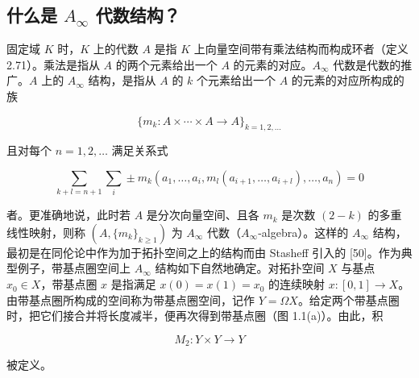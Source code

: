 \subsection{什么是 $A_\infty$ 代数结构？}

固定域 $K$ 时，$K$ 上的代数 $A$ 是指 $K$ 上向量空间带有乘法结构而构成环者（定义 2.71）。乘法是指从 $A$ 的两个元素给出一个 $A$ 的元素的对应。$A_\infty$ 代数是代数的推广。$A$ 上的 $A_\infty$ 结构，是指从 $A$ 的 $k$ 个元素给出一个 $A$ 的元素的对应所构成的族

\[\{m_k : A\times\cdots\times A\to A\}_{k=1,2,\ldots}\]

且对每个 $n=1,2,\ldots$ 满足关系式

\begin{equation}
\sum_{k+l=n+1}\sum_i \pm m_k(a_1,\ldots,a_i,m_l(a_{i+1},\ldots,a_{i+l}),\ldots,a_n)=0 \tag{1.1}
\end{equation}

者。更准确地说，此时若 $A$ 是分次向量空间、且各 $m_k$ 是次数 $(2-k)$ 的多重线性映射，则称 $(A,\{m_k\}_{k\ge1})$ 为 $A_\infty$ 代数（$A_\infty$-algebra）。这样的 $A_\infty$ 结构，最初是在同伦论中作为加于拓扑空间之上的结构而由 Stasheff 引入的 [50]。作为典型例子，带基点圈空间上 $A_\infty$ 结构如下自然地确定。对拓扑空间 $X$ 与基点 $x_0\in X$，带基点圈 $x$ 是指满足 $x(0)=x(1)=x_0$ 的连续映射 $x\colon[0,1]\to X$。由带基点圈所构成的空间称为带基点圈空间，记作 $Y=\Omega X$。给定两个带基点圈时，把它们接合并将长度减半，便再次得到带基点圈（图 1.1(a)）。由此，积

\[M_2 : Y\times Y\to Y\]

被定义。



